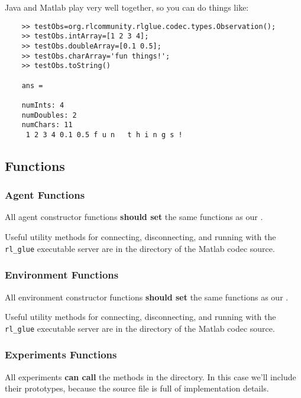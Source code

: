 \documentclass[11pt]{article}
\begin{document}
Java and Matlab play very well together, so you can do things like:
\begin{verbatim}
	>> testObs=org.rlcommunity.rlglue.codec.types.Observation();
	>> testObs.intArray=[1 2 3 4];
	>> testObs.doubleArray=[0.1 0.5];
	>> testObs.charArray='fun things!';
	>> testObs.toString()

	ans =

	numInts: 4
	numDoubles: 2
	numChars: 11
	 1 2 3 4 0.1 0.5 f u n   t h i n g s !
\end{verbatim}

\subsection{Functions}
\subsubsection{Agent Functions}
All agent constructor functions \textbf{should set} the same functions as our .

Useful utility methods for connecting, disconnecting, and running with the \texttt{rl\_glue} executable server are in the  directory of the Matlab codec source.

\subsubsection{Environment Functions}
All environment constructor functions \textbf{should set} the same functions as our .

Useful utility methods for connecting, disconnecting, and running with the \texttt{rl\_glue} executable server are in the  directory of the Matlab codec source.

\subsubsection{Experiments Functions}
All experiments \textbf{can call} the methods in the   directory.
In this case we'll include their prototypes, because the source file is full of implementation details.
\end{document}
